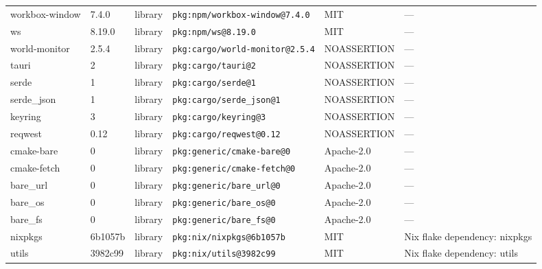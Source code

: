 \documentclass[11pt,a4paper]{article}
\begin{document}
\begin{longtable}{|p{4cm}|p{2cm}|p{1.6cm}|p{5cm}|p{1.5cm}|p{3.5cm}|}
\raggedright workbox-window & 7.4.0 & library & \small\texttt{pkg:npm/workbox-window@7.4.0} & MIT & \small — \\
\raggedright ws & 8.19.0 & library & \small\texttt{pkg:npm/ws@8.19.0} & MIT & \small — \\
\raggedright world-monitor & 2.5.4 & library & \small\texttt{pkg:cargo/world-monitor@2.5.4} & NOASSERTION & \small — \\
\raggedright tauri & 2 & library & \small\texttt{pkg:cargo/tauri@2} & NOASSERTION & \small — \\
\raggedright serde & 1 & library & \small\texttt{pkg:cargo/serde@1} & NOASSERTION & \small — \\
\raggedright serde\_json & 1 & library & \small\texttt{pkg:cargo/serde\_json@1} & NOASSERTION & \small — \\
\raggedright keyring & 3 & library & \small\texttt{pkg:cargo/keyring@3} & NOASSERTION & \small — \\
\raggedright reqwest & 0.12 & library & \small\texttt{pkg:cargo/reqwest@0.12} & NOASSERTION & \small — \\
\raggedright cmake-bare & 0 & library & \small\texttt{pkg:generic/cmake-bare@0} & Apache-2.0 & \small — \\
\raggedright cmake-fetch & 0 & library & \small\texttt{pkg:generic/cmake-fetch@0} & Apache-2.0 & \small — \\
\raggedright bare\_url & 0 & library & \small\texttt{pkg:generic/bare\_url@0} & Apache-2.0 & \small — \\
\raggedright bare\_os & 0 & library & \small\texttt{pkg:generic/bare\_os@0} & Apache-2.0 & \small — \\
\raggedright bare\_fs & 0 & library & \small\texttt{pkg:generic/bare\_fs@0} & Apache-2.0 & \small — \\
\raggedright nixpkgs & 6b1057b & library & \small\texttt{pkg:nix/nixpkgs@6b1057b} & MIT & \small Nix flake dependency: nixpkgs \\
\raggedright utils & 3982c99 & library & \small\texttt{pkg:nix/utils@3982c99} & MIT & \small Nix flake dependency: utils \\
\end{longtable}
\end{document}
